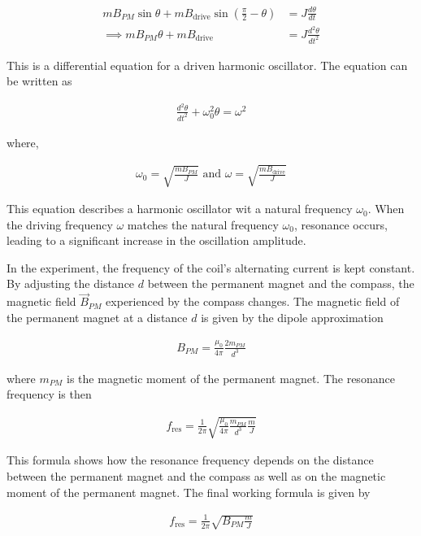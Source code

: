 \begin{align}
    mB_{PM}\sin \theta + mB_\text{drive}\sin(\frac{\pi}{2} - \theta) &= J\frac{d\theta}{dt}\\
    \implies mB_{PM}\theta + mB_\text{drive} &= J\frac{d^2\theta}{dt^2}
\end{align}

This is a differential equation for a driven harmonic oscillator. The equation can be written as

\begin{align}
    \frac{d^2\theta}{dt^2}+\omega_0^2\theta=\omega^2
\end{align}

where,

\begin{align}
    \omega_0 = \sqrt{\frac{mB_{PM}}{J}} \text{  and  } \omega = \sqrt{\frac{mB_\text{drive}}{J}}
\end{align}

This equation describes a harmonic oscillator wit a natural frequency $\omega_0$. When the driving frequency $\omega$  matches the natural frequency $\omega_0$, resonance occurs, leading to a significant increase in the oscillation amplitude.

In the experiment, the frequency of the coil's alternating current is kept constant. By adjusting the distance $d$ between the permanent magnet and the
compass, the magnetic field $\vec{B}_{PM}$ experienced by the compass changes. The magnetic field of the permanent magnet at a distance $d$ is given by the dipole approximation

\begin{align}
    B_{PM} = \frac{\mu_0}{4\pi}\frac{2m_{PM}}{d^3}
\end{align}

where $m_{PM}$ is the magnetic moment of the permanent magnet. The resonance frequency is then

\begin{align}
    f_\text{res} = \frac{1}{2\pi}\sqrt{\frac{\mu_0}{4\pi}\frac{m_{PM}}{d^3}\frac{m}{J}}
\end{align}

This formula shows how the resonance frequency depends on the distance between the permanent magnet and the compass as well as on the magnetic
moment of the permanent magnet. The final working formula is given by

\begin{align}
    f_\text{res} = \frac{1}{2\pi}\sqrt{B_{PM}\frac{m}{J}}
\end{align}

